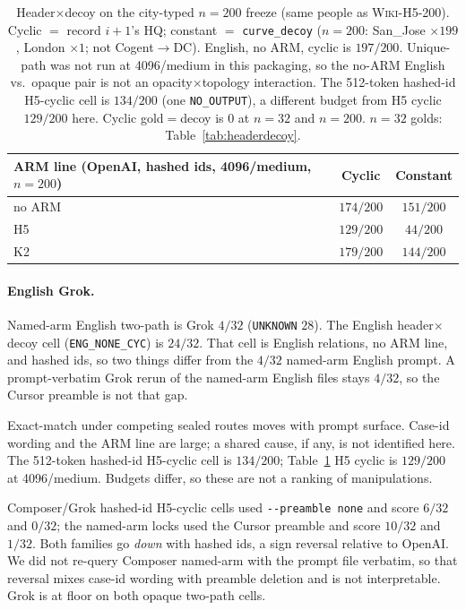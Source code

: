 \documentclass[10pt]{article} %
\begin{document}
\begin{table}[htbp]
\centering
\small

\caption{Header$\times$decoy on the city-typed $n{=}200$ freeze (same people
as \textsc{Wiki-H5-200}).
Cyclic $=$ record $i{+}1$'s HQ; constant $=$ \texttt{curve\_decoy}
($n{=}200$: San\_Jose ${\times}199$, London ${\times}1$; not Cogent$\to$DC).
English, no ARM, cyclic is $197/200$.
Unique-path was not run at 4096/medium in this packaging, so the no-ARM
English vs.\ opaque pair is not an opacity$\times$topology interaction.
The 512-token hashed-id H5-cyclic cell is $134/200$ (one
\texttt{NO\_OUTPUT}), a different budget from H5 cyclic $129/200$ here.
Cyclic gold$=$decoy is $0$ at $n{=}32$ and $n{=}200$.
$n{=}32$ golds: Table~\ref{tab:headerdecoy}.}
\label{tab:headerdecoy200}
\begin{tabular}{@{}lcc@{}}
\toprule
ARM line (OpenAI, hashed ids, 4096/medium, $n{=}200$) & Cyclic & Constant \\
\midrule
no ARM & $174/200$ & $151/200$ \\
H5 & $129/200$ & $44/200$ \\
K2 & $179/200$ & $144/200$ \\
\bottomrule
\end{tabular}

\end{table}

\paragraph{English Grok.}
Named-arm English two-path is Grok $4/32$ (\texttt{UNKNOWN} $28$).
The English header$\times$decoy cell (\texttt{ENG\_NONE\_CYC}) is $24/32$.
That cell is English relations, no ARM line, and hashed ids, so two things
differ from the $4/32$ named-arm English prompt.
A prompt-verbatim Grok rerun of the named-arm English files
stays $4/32$, so the Cursor preamble is not that gap.

Exact-match under competing sealed routes moves with prompt surface.
Case-id wording and the ARM line are large; a shared cause, if any, is
not identified here.
The 512-token hashed-id H5-cyclic cell is $134/200$; Table~\ref{tab:headerdecoy200}
H5 cyclic is $129/200$ at 4096/medium.
Budgets differ, so these are not a ranking of manipulations.

Composer/Grok hashed-id H5-cyclic cells used \texttt{{-}-preamble none} and
score $6/32$ and $0/32$; the named-arm locks used the Cursor preamble and
score $10/32$ and $1/32$.
Both families go \emph{down} with hashed ids, a sign reversal relative to
OpenAI.
We did not re-query Composer named-arm with the prompt file verbatim, so
that reversal mixes case-id wording with preamble deletion and is not
interpretable. Grok is at floor on both opaque two-path cells.
\end{document}
